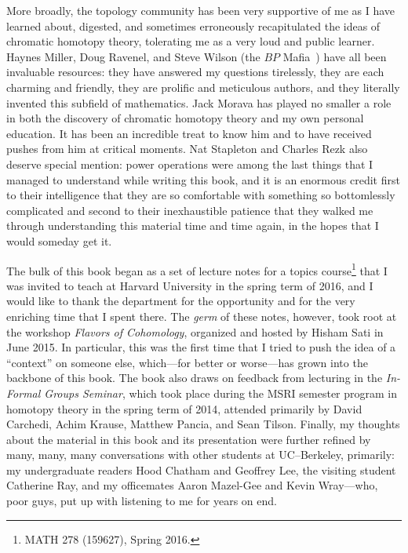 More broadly, the topology community has been very supportive of me as I have learned about, digested, and sometimes erroneously recapitulated the ideas of chromatic homotopy theory, tolerating me as a very loud and public learner.  Haynes Miller, Doug Ravenel, and Steve Wilson (the $BP$ Mafia~\cite{HopkinsOnRavenel}) have all been invaluable resources: they have answered my questions tirelessly, they are each charming and friendly, they are prolific and meticulous authors, and they literally invented this subfield of mathematics.  Jack Morava has played no smaller a role in both the discovery of chromatic homotopy theory and my own personal education.  It has been an incredible treat to know him and to have received pushes from him at critical moments.  Nat Stapleton and Charles Rezk also deserve special mention: power operations were among the last things that I managed to understand while writing this book, and it is an enormous credit first to their intelligence that they are so comfortable with something so bottomlessly complicated and second to their inexhaustible patience that they walked me through understanding this material time and time again, in the hopes that I would someday get it.

The bulk of this book began as a set of lecture notes for a topics course\footnote{MATH 278 (159627), Spring 2016.} that I was invited to teach at Harvard University in the spring term of 2016, and I would like to thank the department for the opportunity and for the very enriching time that I spent there.  The \emph{germ} of these notes, however, took root at the workshop \textit{Flavors of Cohomology}, organized and hosted by Hisham Sati in June 2015.  In particular, this was the first time that I tried to push the idea of a ``context'' on someone else, which---for better or worse---has grown into the backbone of this book.  The book also draws on feedback from lecturing in the \textit{In-Formal Groups Seminar}, which took place during the MSRI semester program in homotopy theory in the spring term of 2014, attended primarily by David Carchedi, Achim Krause, Matthew Pancia, and Sean Tilson.  Finally, my thoughts about the material in this book and its presentation were further refined by many, many, many conversations with other students at UC--Berkeley, primarily: my undergraduate readers Hood Chatham and Geoffrey Lee, the visiting student Catherine Ray, and my officemates Aaron Mazel-Gee and Kevin Wray---who, poor guys, put up with listening to me for years on end.


